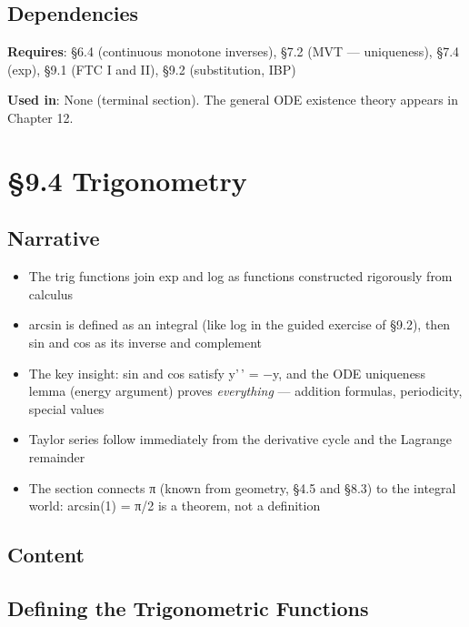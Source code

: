 \documentclass[
  10pt,
  letterpaper,
]{scrbook}
\providecommand{\tightlist}{%
  \setlength{\itemsep}{0pt}\setlength{\parskip}{0pt}}
\begin{document}
\subsection{Dependencies}\label{dependencies-40}

\textbf{Requires}: §6.4 (continuous monotone inverses), §7.2 (MVT ---
uniqueness), §7.4 (exp), §9.1 (FTC I and II), §9.2 (substitution, IBP)

\textbf{Used in}: None (terminal section). The general ODE existence
theory appears in Chapter 12.

\section{§9.4 Trigonometry}\label{trigonometry-1}

\subsection{Narrative}\label{narrative-41}

\begin{itemize}
\tightlist
\item
  The trig functions join exp and log as functions constructed
  rigorously from calculus
\item
  arcsin is defined as an integral (like log in the guided exercise of
  §9.2), then sin and cos as its inverse and complement
\item
  The key insight: sin and cos satisfy y'\,' = −y, and the ODE
  uniqueness lemma (energy argument) proves \emph{everything} ---
  addition formulas, periodicity, special values
\item
  Taylor series follow immediately from the derivative cycle and the
  Lagrange remainder
\item
  The section connects π (known from geometry, §4.5 and §8.3) to the
  integral world: arcsin(1) = π/2 is a theorem, not a definition
\end{itemize}

\subsection{Content}\label{content-41}

\subsection{Defining the Trigonometric
Functions}\label{defining-the-trigonometric-functions}
\end{document}
